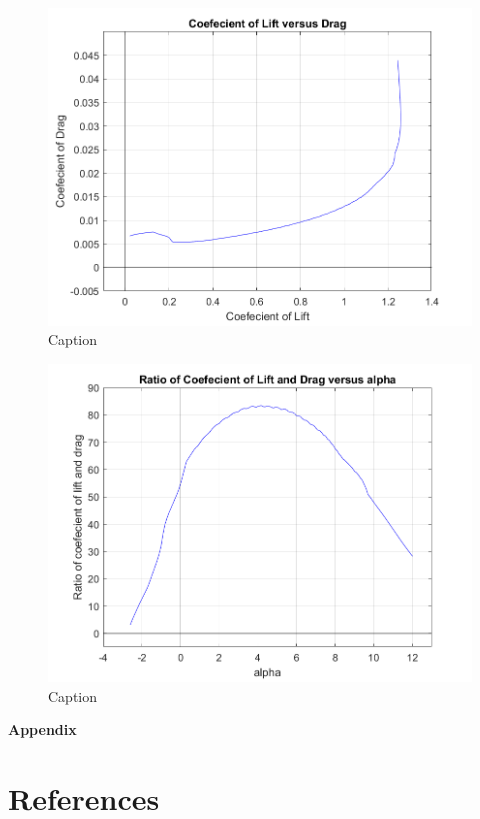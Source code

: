 \documentclass[12 pt]{article}
\begin{document}
\begin{figure}[h]
    \centering
    \includegraphics[width = \linewidth]{Codes/Week 6/Cl_Cd.png}
    \caption{Caption}
    \label{fig:enter-label}
\end{figure}

\begin{figure}
    \centering
    \includegraphics[width=\linewidth]{Codes/Week 6/Cl_Cd_ratio.png}
    \caption{Caption}
    \label{fig:enter-label}
\end{figure}

\newpage
\textbf{\Huge{Appendix}}
\appendix


\section{References}
\end{document}
